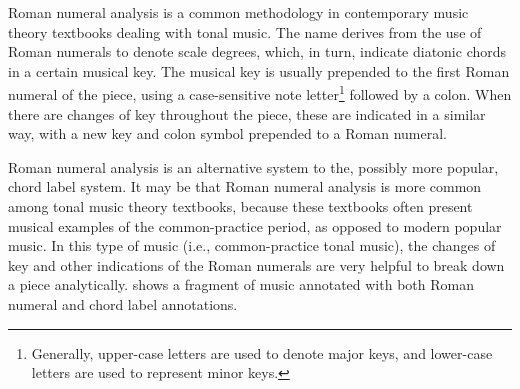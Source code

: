 Roman numeral analysis is a common methodology in
contemporary music theory textbooks dealing with tonal
music. The name derives from the use of Roman numerals to
denote scale degrees, which, in turn, indicate diatonic
chords in a certain musical key. The musical key is usually
prepended to the first Roman numeral of the piece, using a
case-sensitive note letter\footnote{Generally, upper-case
letters are used to denote major keys, and lower-case
letters are used to represent minor keys.} followed by a
colon. When there are changes of key throughout the piece,
these are indicated in a similar way, with a new key and
colon symbol prepended to a Roman numeral.

Roman numeral analysis is an alternative system to the,
possibly more popular, chord label system. It may be that
Roman numeral analysis is more common among tonal music
theory textbooks, because these textbooks often present
musical examples of the common-practice period, as opposed
to modern popular music. In this type of music (i.e.,
common-practice tonal music), the changes of key and other
indications of the Roman numerals are very helpful to break
down a piece analytically.  shows a fragment
of music annotated with both Roman numeral and chord label
annotations.

